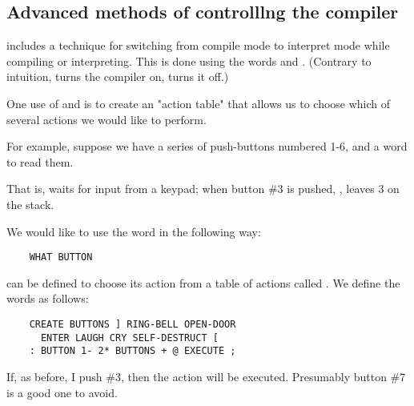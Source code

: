 \subsection{Advanced methods of controlllng the compiler}

 includes a technique for switching from compile mode to interpret mode while compiling or interpreting. This is done using the words \bc{]} and \bc{[} . (Contrary to intuition, \bc{]} turns the compiler on, \bc{[} turns it off.)

One use of \bc{]} and \bc{[} is to create an "action table" that allows us to choose which of several actions we would like to perform.

For example, suppose we have a series of push-buttons numbered 1-6, and a word  to read them.

That is,  waits for input from a keypad; when button \#3 is pushed, \eg,  leaves 3 on the stack.

We would like to use the word  in the following way:

\begin{lstlisting}
    WHAT BUTTON
\end{lstlisting}

 can be defined to choose its action from a table of
actions called  . We define the words as follows:

\begin{lstlisting}
    CREATE BUTTONS ] RING-BELL OPEN-DOOR
      ENTER LAUGH CRY SELF-DESTRUCT [
    : BUTTON 1- 2* BUTTONS + @ EXECUTE ;
\end{lstlisting}

If, as before, I push \#3, then the action  will be executed. Presumably button \#7 is a good one to avoid.


